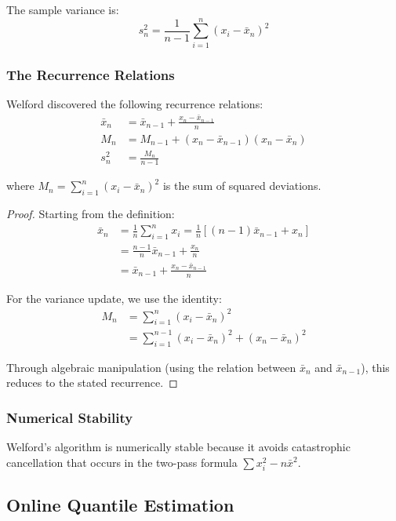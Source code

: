\documentclass[12pt,a4paper]{article}
\begin{document}
The sample variance is:
\begin{equation}
s_n^2 = \frac{1}{n-1}\sum_{i=1}^n (x_i - \bar{x}_n)^2
\end{equation}

\subsubsection{The Recurrence Relations}
Welford discovered the following recurrence relations:
\begin{align}
\bar{x}_n &= \bar{x}_{n-1} + \frac{x_n - \bar{x}_{n-1}}{n} \\
M_n &= M_{n-1} + (x_n - \bar{x}_{n-1})(x_n - \bar{x}_n) \\
s_n^2 &= \frac{M_n}{n-1}
\end{align}

where $M_n = \sum_{i=1}^n (x_i - \bar{x}_n)^2$ is the sum of squared deviations.

\begin{proof}
Starting from the definition:
\begin{align*}
\bar{x}_n &= \frac{1}{n}\sum_{i=1}^n x_i = \frac{1}{n}\left[(n-1)\bar{x}_{n-1} + x_n\right] \\
&= \frac{n-1}{n}\bar{x}_{n-1} + \frac{x_n}{n} \\
&= \bar{x}_{n-1} + \frac{x_n - \bar{x}_{n-1}}{n}
\end{align*}

For the variance update, we use the identity:
\begin{align*}
M_n &= \sum_{i=1}^n (x_i - \bar{x}_n)^2 \\
&= \sum_{i=1}^{n-1} (x_i - \bar{x}_n)^2 + (x_n - \bar{x}_n)^2
\end{align*}

Through algebraic manipulation (using the relation between $\bar{x}_n$ and $\bar{x}_{n-1}$), this reduces to the stated recurrence.
\end{proof}

\subsubsection{Numerical Stability}
Welford's algorithm is numerically stable because it avoids catastrophic cancellation that occurs in the two-pass formula $\sum x_i^2 - n\bar{x}^2$.

\subsection{Online Quantile Estimation}
\end{document}
